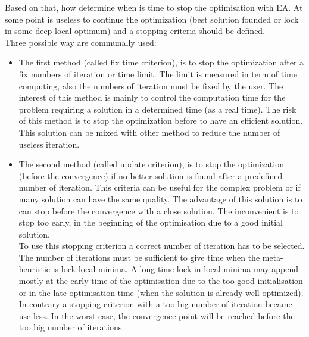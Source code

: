 
Based on that, how  determine when is time to stop the optimisation with EA. At some point is useless to continue the optimization (best solution founded or lock in some deep local optimum) and a stopping criteria should be defined.\\ 
Three possible way are communally used:\\
\begin{itemize}
\item The first method (called fix time criterion), is to stop the optimization after a fix numbers of iteration or time limit. The limit is measured in term of time computing, also the numbers of iteration must be fixed by the user. The interest of this method is mainly to control the computation time for the problem requiring a solution in a determined time (as a real time). The risk of this method is to stop the optimization before to have an efficient solution. \\
This solution can be mixed with other method to reduce the number of useless iteration.%

\item The second method (called update criterion), is to stop the optimization (before the convergence) if no better solution is found after a predefined number of iteration. This criteria can be useful for the complex problem or if many solution can have the same quality. 
The advantage of this solution is to can stop before the convergence with a close solution. The inconvenient is to stop too early, in the beginning of the optimisation due to a good initial solution.   \\
To use this stopping criterion a correct number of iteration has to  be selected. 
The number of iterations  must be sufficient to give time when the meta-heuristic is lock local minima. 
A long time lock in local minima may append mostly at the early time of the optimisation due to the too good initialisation or in the late optimisation time (when the solution is already well optimized).\\
 In contrary a stopping criterion with a too big number of iteration became use less. In the worst case, the convergence point will be reached  before the too big number of iterations.


\end{itemize}
